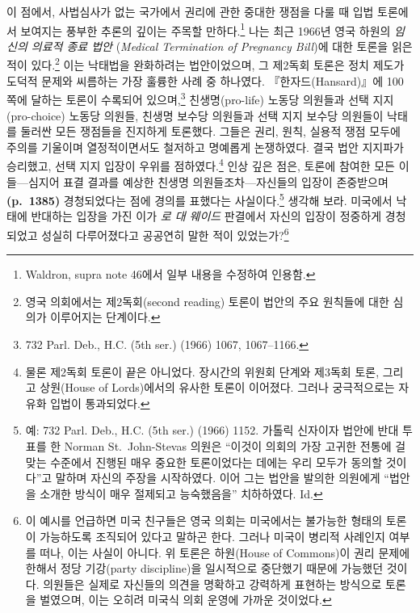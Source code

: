 \documentclass[a4paper,12pt,oneside]{article}  %
\newcommand{\emphksans}[1]{%
  {\kopubhangul\kopublatin\textsl{#1}}%
}
\begin{document}
이 점에서, 사법심사가 없는 국가에서 권리에 관한 중대한 쟁점을 다룰 때
입법 토론에서 보여지는 풍부한 추론의 깊이는 주목할 만하다.\footnote{Waldron,
  supra note 46에서 일부 내용을 수정하여 인용함.} 나는 최근 1966년 영국
하원의 \emphksans{임신의 의료적 종료 법안}(\emph{Medical Termination of Pregnancy
Bill})에 대한 토론을 읽은 적이 있다.\footnote{영국 의회에서는
  제2독회(second reading) 토론이 법안의 주요 원칙들에 대한 심의가
  이루어지는 단계이다.} 이는 낙태법을 완화하려는 법안이었으며, 그
제2독회 토론은 정치 제도가 도덕적 문제와 씨름하는 가장 훌륭한 사례 중
하나였다. 『한자드(Hansard)』에 100쪽에 달하는 토론이 수록되어
있으며,\footnote{732 Parl. Deb., H.C. (5th ser.) (1966) 1067,
  1067--1166.} 친생명(pro-life) 노동당 의원들과 선택 지지(pro-choice)
노동당 의원들, 친생명 보수당 의원들과 선택 지지 보수당 의원들이 낙태를
둘러싼 모든 쟁점들을 진지하게 토론했다. 그들은 권리, 원칙, 실용적 쟁점
모두에 주의를 기울이며 열정적이면서도 철저하고 명예롭게 논쟁하였다. 결국
법안 지지파가 승리했고, 선택 지지 입장이 우위를 점하였다.\footnote{물론
  제2독회 토론이 끝은 아니었다. 장시간의 위원회 단계와 제3독회 토론,
  그리고 상원(House of Lords)에서의 유사한 토론이 이어졌다. 그러나
  궁극적으로는 자유화 입법이 통과되었다.} 인상 깊은 점은, 토론에 참여한
모든 이들---심지어 표결 결과를 예상한 친생명 의원들조차---자신들의
입장이 존중받으며 \textbf{(p.~1385)} 경청되었다는 점에 경의를 표했다는
사실이다.\footnote{예: 732 Parl. Deb., H.C. (5th ser.) (1966) 1152.
  가톨릭 신자이자 법안에 반대 투표를 한 Norman St.~John-Stevas 의원은
  ``이것이 의회의 가장 고귀한 전통에 걸맞는 수준에서 진행된 매우 중요한
  토론이었다는 데에는 우리 모두가 동의할 것이다''고 말하며 자신의 주장을
  시작하였다. 이어 그는 법안을 발의한 의원에게 ``법안을 소개한 방식이
  매우 절제되고 능숙했음을'' 치하하였다. Id.} 생각해 보라. 미국에서
낙태에 반대하는 입장을 가진 이가 \emphksans{로 대 웨이드} 판결에서 자신의
입장이 정중하게 경청되었고 성실히 다루어졌다고 공공연히 말한 적이
있었는가?\footnote{이 예시를 언급하면 미국 친구들은 영국 의회는
  미국에서는 불가능한 형태의 토론이 가능하도록 조직되어 있다고 말하곤
  한다. 그러나 미국이 병리적 사례인지 여부를 떠나, 이는 사실이 아니다.
  위 토론은 하원(House of Commons)이 권리 문제에 한해서 정당 기강(party
  discipline)을 일시적으로 중단했기 때문에 가능했던 것이다. 의원들은
  실제로 자신들의 의견을 명확하고 강력하게 표현하는 방식으로 토론을
  벌였으며, 이는 오히려 미국식 의회 운영에 가까운 것이었다.}
\end{document}
